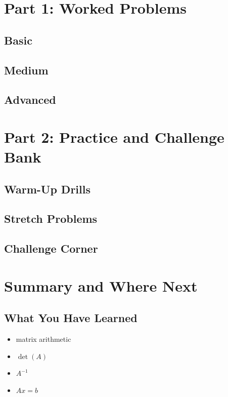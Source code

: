 \documentclass[12pt]{article}
\begin{document}
\section{Part 1: Worked Problems}

\subsection{Basic}


\subsection{Medium}


\subsection{Advanced}


\section{Part 2: Practice and Challenge Bank}

\subsection{Warm-Up Drills}


\subsection{Stretch Problems}


\subsection{Challenge Corner}





\newpage
\section{Summary and Where Next}

\subsection*{What You Have Learned}
\begin{itemize}[label=\(\Box\)]
    \item matrix arithmetic
    \item \(\det(A)\)
    \item \(A^{-1}\)
    \item \(Ax=b\)
\end{itemize}
\end{document}
